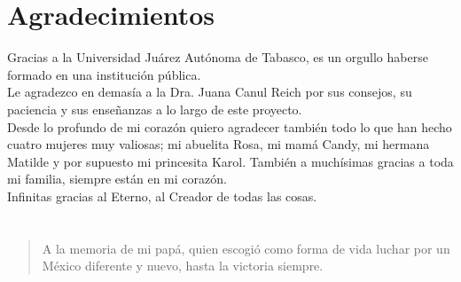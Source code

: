 \chapter*{Agradecimientos}

Gracias a la Universidad Juárez Autónoma de Tabasco, es un orgullo haberse
formado en una institución pública. \\

Le agradezco en demasía a la Dra. Juana Canul Reich por sus consejos, su
paciencia y sus enseñanzas a lo largo de este proyecto. \\

Desde lo profundo de mi corazón quiero agradecer también todo lo que han hecho
cuatro mujeres muy valiosas; mi abuelita Rosa, mi mamá Candy, mi hermana
Matilde y por supuesto mi princesita Karol. También a muchísimas gracias a toda
mi familia, siempre están en mi corazón. \\

Infinitas gracias al Eterno, al Creador de todas las cosas.

\newpage
{}
\chapter*{}

\newenvironment{dedication}
    {\vspace{6ex}
    \begin{quotation}\begin{em}}
    {\par\end{em}
    \end{quotation}}

\begin{dedication}

A la memoria de mi papá, quien escogió como forma de vida luchar por un México
diferente y nuevo, hasta la victoria siempre.

\end{dedication}
